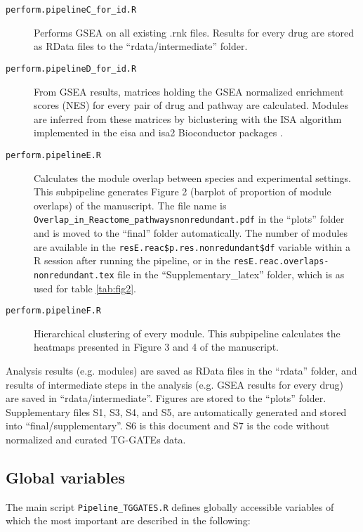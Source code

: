 \documentclass[a4paper,10pt]{scrartcl}
\begin{document}
\begin{description}
 \item[\texttt{perform.pipelineC\_for\_id.R}] Performs GSEA on all existing .rnk files. Results for every drug are stored as RData files to the ``rdata/intermediate'' folder.
 \item[\texttt{perform.pipelineD\_for\_id.R}] From GSEA results, matrices holding the GSEA normalized enrichment scores (NES) for every pair of drug and pathway are calculated. Modules are inferred from these matrices by biclustering with the ISA algorithm implemented in the eisa and isa2 Bioconductor packages \cite{isa1, isa2}.
 \item[\texttt{perform.pipelineE.R}] Calculates the module overlap between species and experimental settings. This subpipeline generates Figure 2 (barplot of proportion of module overlaps) of the manuscript. The file name is \verb+Overlap_in_Reactome_pathwaysnonredundant.pdf+ in the ``plots'' folder and is moved to the ``final'' folder automatically. The number of modules are available in the \verb+resE.reac$p.res.nonredundant$df+ variable within a R session after running the pipeline, or in the \verb+resE.reac.overlaps-nonredundant.tex+ file in the ``Supplementary\_latex'' folder, which is as used for table \ref{tab:fig2}.
 \item[\texttt{perform.pipelineF.R}] Hierarchical clustering of every module. This subpipeline calculates the heatmaps presented in Figure 3 and 4 of the manuscript.
\end{description}

Analysis results (e.g. modules) are saved as RData files in the ``rdata'' folder, and results of intermediate steps in the analysis (e.g. GSEA results for every drug) are saved in ``rdata/intermediate''. Figures are stored to the ``plots'' folder. Supplementary files S1, S3, S4, and S5, are automatically generated and stored into ``final/supplementary''. S6 is this document and S7 is the code without normalized and curated TG-GATEs data.



\subsection{Global variables}

The main script \verb+Pipeline_TGGATES.R+ defines globally accessible variables of which the most important are described in the following:
\end{document}
